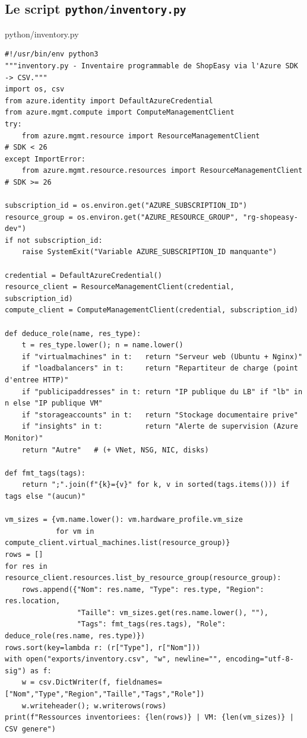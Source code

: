 \documentclass[11pt,a4paper]{article}
\newcommand{\code}[1]{\texttt{#1}}
\begin{document}
\subsection{Le script \code{python/inventory.py}}
\begin{codebox}{python/inventory.py}
\begin{Verbatim}
#!/usr/bin/env python3
"""inventory.py - Inventaire programmable de ShopEasy via l'Azure SDK -> CSV."""
import os, csv
from azure.identity import DefaultAzureCredential
from azure.mgmt.compute import ComputeManagementClient
try:
    from azure.mgmt.resource import ResourceManagementClient            # SDK < 26
except ImportError:
    from azure.mgmt.resource.resources import ResourceManagementClient  # SDK >= 26

subscription_id = os.environ.get("AZURE_SUBSCRIPTION_ID")
resource_group = os.environ.get("AZURE_RESOURCE_GROUP", "rg-shopeasy-dev")
if not subscription_id:
    raise SystemExit("Variable AZURE_SUBSCRIPTION_ID manquante")

credential = DefaultAzureCredential()
resource_client = ResourceManagementClient(credential, subscription_id)
compute_client = ComputeManagementClient(credential, subscription_id)

def deduce_role(name, res_type):
    t = res_type.lower(); n = name.lower()
    if "virtualmachines" in t:   return "Serveur web (Ubuntu + Nginx)"
    if "loadbalancers" in t:     return "Repartiteur de charge (point d'entree HTTP)"
    if "publicipaddresses" in t: return "IP publique du LB" if "lb" in n else "IP publique VM"
    if "storageaccounts" in t:   return "Stockage documentaire prive"
    if "insights" in t:          return "Alerte de supervision (Azure Monitor)"
    return "Autre"   # (+ VNet, NSG, NIC, disks)

def fmt_tags(tags):
    return ";".join(f"{k}={v}" for k, v in sorted(tags.items())) if tags else "(aucun)"

vm_sizes = {vm.name.lower(): vm.hardware_profile.vm_size
            for vm in compute_client.virtual_machines.list(resource_group)}
rows = []
for res in resource_client.resources.list_by_resource_group(resource_group):
    rows.append({"Nom": res.name, "Type": res.type, "Region": res.location,
                 "Taille": vm_sizes.get(res.name.lower(), ""),
                 "Tags": fmt_tags(res.tags), "Role": deduce_role(res.name, res.type)})
rows.sort(key=lambda r: (r["Type"], r["Nom"]))
with open("exports/inventory.csv", "w", newline="", encoding="utf-8-sig") as f:
    w = csv.DictWriter(f, fieldnames=["Nom","Type","Region","Taille","Tags","Role"])
    w.writeheader(); w.writerows(rows)
print(f"Ressources inventoriees: {len(rows)} | VM: {len(vm_sizes)} | CSV genere")
\end{Verbatim}
\end{codebox}
\end{document}
